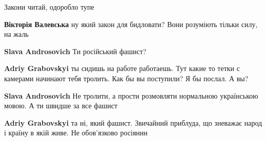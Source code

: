 \begin{itemize}
\begin{itemize}
Закони читай, одоробло тупе

 
\textbf{Вікторія Валевська} ну який закон для бидловати? Вони розуміють тільки силу, на жаль

 
\textbf{Slava Androsovich} Ти російський фашист?

 
\textbf{Adriy Grabovskyi} ты сидишь на работе работаешь. Тут какие то тетки с камерами начинают тебя тролить. Как бы вы поступили? Я бы послал. А вы?

 
\textbf{Slava Androsovich} Не тролити, а прости розмовляти нормальною українською мовою. А ти швидше за все фашист

 
\textbf{Adriy Grabovskyi} та ні, який фашист. Звичайний приблуда, що зневажає народ і країну в якій живе. Не обов'язково росіянин

 

\end{itemize}
\end{itemize}
